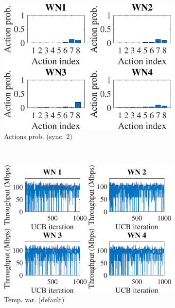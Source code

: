 \documentclass[preprint,12pt]{article}
\begin{document}
\begin{figure}[h!]
\begin{subfigure}[b]{.3\textwidth}
		\includegraphics[width=\textwidth]{images/actions_probability_CUCB}
		\caption{Actions prob. (sync. 2)}\label{fig:actions_probability_CUCB}
	\end{subfigure}\\
	\begin{subfigure}[b]{.3\textwidth}
		\includegraphics[width=\textwidth]{images/temporal_individual_tpt_UCB}
		\caption{Temp. var.  (default)}\label{fig:temporal_individual_tpt_UCB}
	\end{subfigure}
	\begin{subfigure}[b]{.3\textwidth}

\end{subfigure}
\end{figure}
\end{document}
